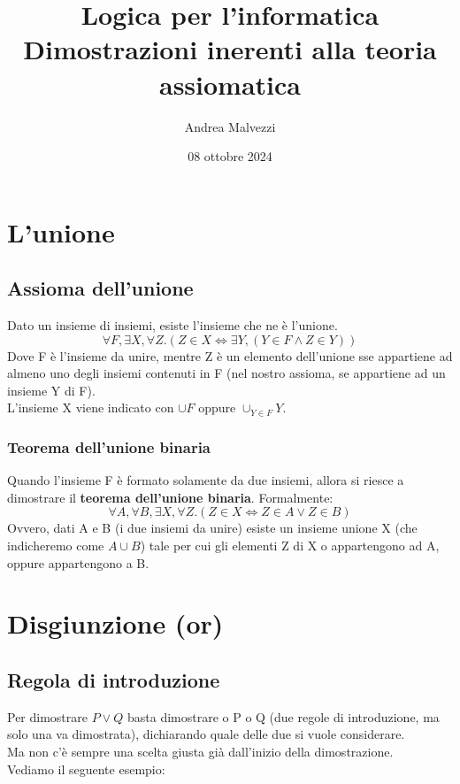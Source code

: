 \documentclass[12pt]{article}
\title{\textbf{Logica per l'informatica\\Dimostrazioni inerenti alla teoria assiomatica}}
\date{08 ottobre 2024}
\author{Andrea Malvezzi}
\begin{document}
\maketitle
\pagebreak
\tableofcontents
\pagebreak
\section{L'unione}
\subsection{Assioma dell'unione}
Dato un insieme di insiemi, esiste l'insieme che ne è l'unione.
\begin{equation}
    \forall F, \exists X, \forall Z. (Z \in X \Leftrightarrow \exists Y, (Y \in F \wedge Z \in Y)) \label{ass:unione}
\end{equation}
Dove F è l'insieme da unire, mentre Z è un elemento dell'unione sse appartiene ad almeno uno degli insiemi contenuti in F (nel nostro assioma, se appartiene ad un insieme Y di F).\\
L'insieme X viene indicato con $\cup F$ oppure $\cup_{Y \in F}Y$.
\subsubsection{Teorema dell'unione binaria}
Quando l'insieme F è formato solamente da due insiemi, allora si riesce a dimostrare il \textbf{teorema dell'unione binaria}.
Formalmente:
\begin{equation}
    \forall A, \forall B, \exists X, \forall Z. (Z \in X \Leftrightarrow Z \in A \vee Z \in B) \label{teo:unione_binaria}
\end{equation}
Ovvero, dati A e B (i due insiemi da unire) esiste un insieme unione X (che indicheremo come $A \cup B$) tale per cui gli elementi Z di X o appartengono ad A, oppure appartengono a B.
\section{Disgiunzione (or)}
\subsection{Regola di introduzione}
Per dimostrare $P \vee Q$ basta dimostrare o P o Q (due regole di introduzione, ma solo una va dimostrata), dichiarando quale delle due si vuole considerare.\\
Ma non c'è sempre una scelta giusta già dall'inizio della dimostrazione. \\
Vediamo il seguente esempio:
\end{document}
